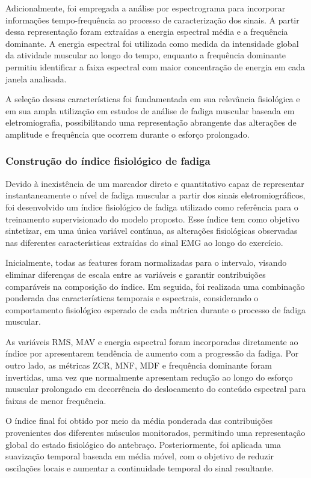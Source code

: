 \documentclass[symbols]{fei}
\begin{document}
Adicionalmente, foi empregada a análise por espectrograma para incorporar informações 
tempo-frequência ao processo de caracterização dos sinais. A partir dessa 
representação foram extraídas a energia espectral média e a frequência dominante. A 
energia espectral foi utilizada como medida da intensidade global da atividade 
muscular ao longo do tempo, enquanto a frequência dominante permitiu identificar a faixa espectral com maior concentração de energia em cada janela analisada.

A seleção dessas características foi fundamentada 
em sua relevância fisiológica e em sua ampla utilização 
em estudos de análise de fadiga muscular baseada em 
eletromiografia, possibilitando uma representação 
abrangente das alterações de amplitude e frequência que ocorrem durante o esforço prolongado.

\subsubsection{Construção do índice fisiológico de fadiga}

Devido à inexistência de um marcador direto e quantitativo capaz de representar instantaneamente o nível de fadiga muscular a partir dos 
sinais eletromiográficos, foi desenvolvido um índice fisiológico de fadiga utilizado como referência para o 
treinamento supervisionado do modelo proposto. Esse índice tem como objetivo sintetizar, em uma única variável contínua, as 
alterações fisiológicas observadas nas diferentes características extraídas do sinal EMG ao longo do exercício.

Inicialmente, todas as features foram normalizadas para o intervalo, visando eliminar diferenças 
de escala entre as variáveis e garantir contribuições comparáveis na composição do índice. Em seguida, 
foi realizada uma combinação ponderada das características temporais e espectrais, considerando o comportamento 
fisiológico esperado de cada métrica durante o processo de fadiga muscular.

As variáveis RMS, MAV e energia espectral foram incorporadas diretamente ao índice por apresentarem 
tendência de aumento com a progressão da fadiga. Por outro lado, as métricas ZCR, MNF, MDF e frequência dominante foram invertidas, uma vez que normalmente 
apresentam redução ao longo do esforço muscular prolongado em decorrência do deslocamento do conteúdo espectral para faixas de menor frequência.

O índice final foi obtido por meio da média ponderada das contribuições 
provenientes dos diferentes músculos monitorados, permitindo uma 
representação global do estado fisiológico do antebraço. Posteriormente, 
foi aplicada uma suavização temporal baseada em média móvel, com o objetivo 
de reduzir oscilações locais e aumentar a continuidade temporal do sinal resultante.
\end{document}

